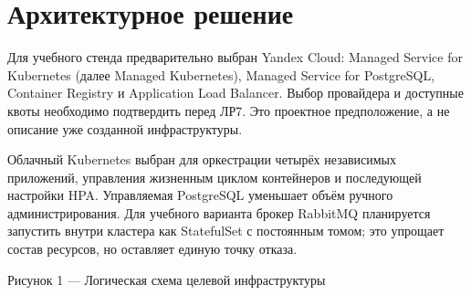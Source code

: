 \documentclass[14pt,a4paper]{extarticle}
\begin{document}
\section{Архитектурное решение}
Для учебного стенда предварительно выбран Yandex Cloud: Managed Service for Kubernetes (далее Managed Kubernetes), Managed Service for PostgreSQL, Container Registry и Application Load Balancer. Выбор провайдера и доступные квоты необходимо подтвердить перед ЛР7. Это проектное предположение, а не описание уже созданной инфраструктуры.

Облачный Kubernetes выбран для оркестрации четырёх независимых приложений, управления жизненным циклом контейнеров и последующей настройки HPA. Управляемая PostgreSQL уменьшает объём ручного администрирования. Для учебного варианта брокер RabbitMQ планируется запустить внутри кластера как StatefulSet с постоянным томом; это упрощает состав ресурсов, но оставляет единую точку отказа.

\begin{center}

Рисунок 1 --- Логическая схема целевой инфраструктуры
\end{center}
\end{document}
